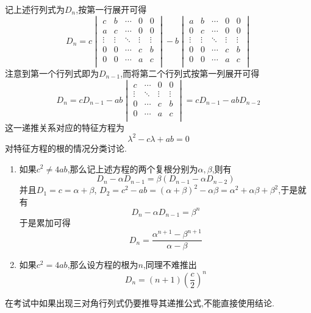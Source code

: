 \documentclass{ctexart}
\begin{document}
\begin{solution}
    记上述行列式为$D_n$,按第一行展开可得
    \[D_n=c\begin{vmatrix}
        c&b&\cdots&0&0\\
        a&c&\cdots&0&0\\
        \vdots&\vdots&\ddots&\vdots&\vdots\\
        0&0&\cdots&c&b\\
        0&0&\cdots&a&c\\
    \end{vmatrix}-b\begin{vmatrix}
        a&b&\cdots&0&0\\
        0&c&\cdots&0&0\\
        \vdots&\vdots&\ddots&\vdots&\vdots\\
        0&0&\cdots&c&b\\
        0&0&\cdots&a&c\\
    \end{vmatrix}\]
    注意到第一个行列式即为$D_{n-1}$,而将第二个行列式按第一列展开可得
    \[D_n=cD_{n-1}-ab\begin{vmatrix}
        c&\cdots&0&0\\
        \vdots&\ddots&\vdots&\vdots\\
        0&\cdots&c&b\\
        0&\cdots&a&c\\
    \end{vmatrix}=cD_{n-1}-abD_{n-2}\]
    这一递推关系对应的特征方程为
    \[\lambda^2-c\lambda+ab=0\]
    对特征方程的根的情况分类讨论.
    \begin{enumerate}[label=\tbf{\alph*.}]
        \item 如果$c^2\neq 4ab$,那么记上述方程的两个复根分别为$\alpha,\beta$,则有
        \[D_n-\alpha D_{n-1}=\beta\left(D_{n-1}-\alpha D_{n-2}\right)\]
        并且$D_1=c=\alpha+\beta$, $D_2=c^2-ab=\left(\alpha+\beta\right)^2-\alpha\beta=\alpha^2+\alpha\beta+\beta^2$,于是就有
        \[D_{n}-\alpha D_{n-1}=\beta^n\]
        于是累加可得
        \[D_n=\dfrac{\alpha^{n+1}-\beta^{n+1}}{\alpha-\beta}\]
        \item 如果$c^2=4ab$,那么设方程的根为$n$,同理不难推出
        \[D_n=(n+1)\left(\dfrac{c}{2}\right)^n\]
    \end{enumerate}
\end{solution}
\begin{hint}
    在考试中如果出现三对角行列式仍要推导其递推公式,不能直接使用结论.
\end{hint}
\end{document}

